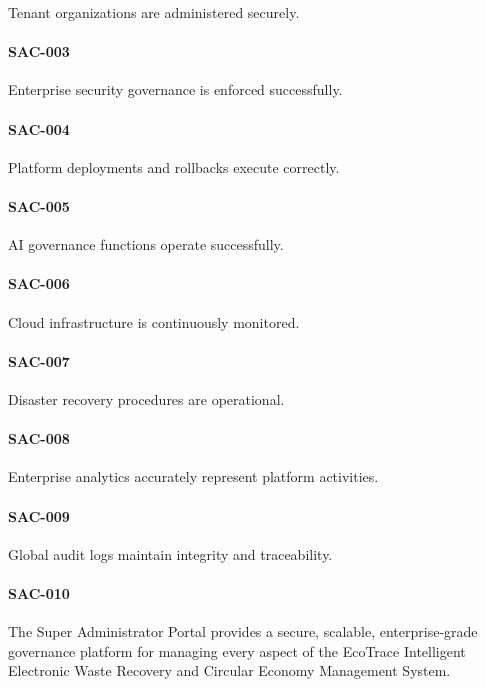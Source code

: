 Tenant organizations are administered securely.

\paragraph{SAC-003}

Enterprise security governance is enforced successfully.

\paragraph{SAC-004}

Platform deployments and rollbacks execute correctly.

\paragraph{SAC-005}

AI governance functions operate successfully.

\paragraph{SAC-006}

Cloud infrastructure is continuously monitored.

\paragraph{SAC-007}

Disaster recovery procedures are operational.

\paragraph{SAC-008}

Enterprise analytics accurately represent platform activities.

\paragraph{SAC-009}

Global audit logs maintain integrity and traceability.

\paragraph{SAC-010}

The Super Administrator Portal provides a secure, scalable,
enterprise-grade governance platform for managing every aspect of the
EcoTrace Intelligent Electronic Waste Recovery and Circular Economy
Management System.

